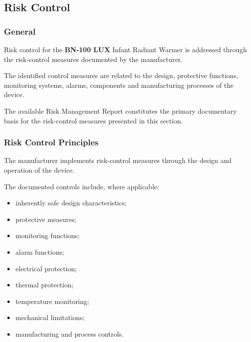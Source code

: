 
\hypertarget{p3-4-3}{}

\subsection{Risk Control}

\subsubsection{General}

Risk control for the \textbf{BN-100 LUX} Infant Radiant Warmer is addressed
through the risk-control measures documented by the manufacturer.

The identified control measures are related to the design, protective
functions, monitoring systems, alarms, components and manufacturing
processes of the device.

The available Risk Management Report constitutes the primary documentary
basis for the risk-control measures presented in this section.

\subsubsection{Risk Control Principles}

The manufacturer implements risk-control measures through the design and
operation of the device.

The documented controls include, where applicable:

\begin{itemize}

    \item inherently safe design characteristics;

    \item protective measures;

    \item monitoring functions;

    \item alarm functions;

    \item electrical protection;

    \item thermal protection;

    \item temperature monitoring;

    \item mechanical limitations;

    \item manufacturing and process controls.

\end{itemize}

